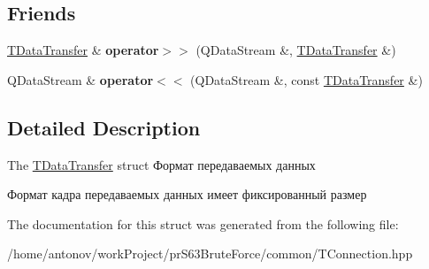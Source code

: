 \subsection*{Friends}
\begin{DoxyCompactItemize}
\item 
\mbox{\label{structconnection_1_1_t_data_transfer_aa8825827be912f7c88a0fc5165345b9c}} 
\hyperlink{structconnection_1_1_t_data_transfer}{T\+Data\+Transfer} \& {\bfseries operator$>$$>$} (Q\+Data\+Stream \&, \hyperlink{structconnection_1_1_t_data_transfer}{T\+Data\+Transfer} \&)
\item 
\mbox{\label{structconnection_1_1_t_data_transfer_ace0b5fbb944e7181346dda303ad35aa4}} 
Q\+Data\+Stream \& {\bfseries operator$<$$<$} (Q\+Data\+Stream \&, const \hyperlink{structconnection_1_1_t_data_transfer}{T\+Data\+Transfer} \&)
\end{DoxyCompactItemize}


\subsection{Detailed Description}
The \hyperlink{structconnection_1_1_t_data_transfer}{T\+Data\+Transfer} struct Формат передаваемых данных 

Формат кадра передаваемых данных имеет фиксированный размер 

The documentation for this struct was generated from the following file\+:\begin{DoxyCompactItemize}
\item 
/home/antonov/work\+Project/pr\+S63\+Brute\+Force/common/T\+Connection.\+hpp\end{DoxyCompactItemize}
